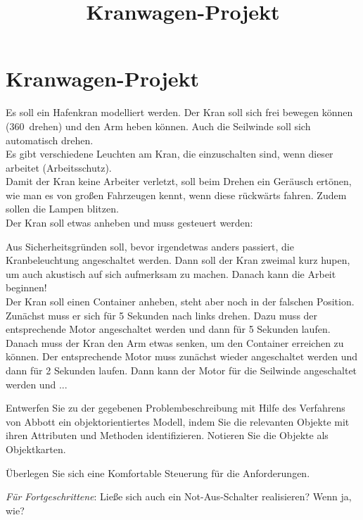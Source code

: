 \documentclass[11pt, a4paper]{scrartcl}
\title{Kranwagen-Projekt}
\begin{document}
\section*{Kranwagen-Projekt}

Es soll ein Hafenkran modelliert werden. Der Kran soll sich frei bewegen können (360\textdegree~drehen) und den Arm heben können. Auch die Seilwinde soll sich automatisch drehen.\\

Es gibt verschiedene Leuchten am Kran, die einzuschalten sind, wenn dieser arbeitet (Arbeitsschutz).\\

Damit der Kran keine Arbeiter verletzt, soll beim Drehen ein Geräusch ertönen, wie man es von großen Fahrzeugen kennt, wenn diese rückwärts fahren. Zudem sollen die Lampen blitzen.\\

Der Kran soll etwas anheben und muss gesteuert werden:

\begin{mdframed}
Aus Sicherheitsgründen soll, bevor irgendetwas anders passiert, die Kranbeleuchtung angeschaltet werden. Dann soll der Kran zweimal kurz hupen, um auch akustisch auf sich aufmerksam zu machen. Danach kann die Arbeit beginnen!\\

Der Kran soll einen Container anheben, steht aber noch in der falschen Position. Zunächst muss er sich für 5 Sekunden nach links drehen. Dazu muss der entsprechende Motor angeschaltet werden und dann für 5 Sekunden laufen. Danach muss der Kran den Arm etwas senken, um den Container erreichen zu können. Der entsprechende Motor muss zunächst wieder angeschaltet werden und dann für 2 Sekunden laufen. Dann kann der Motor für die Seilwinde angeschaltet werden und ...
\end{mdframed}

\vfill

\begin{aufgabe}
Entwerfen Sie zu der gegebenen Problembeschreibung mit Hilfe des Verfahrens von Abbott ein objektorientiertes Modell, indem Sie die relevanten Objekte mit ihren Attributen und Methoden identifizieren. Notieren Sie die Objekte als Objektkarten.
\end{aufgabe}

\begin{aufgabe}
Überlegen Sie sich eine Komfortable Steuerung für die Anforderungen. 
\end{aufgabe}

\begin{aufgabe}
\emph{Für Fortgeschrittene}: Ließe sich auch ein Not-Aus-Schalter realisieren? Wenn ja, wie?
\end{aufgabe}
\end{document}
